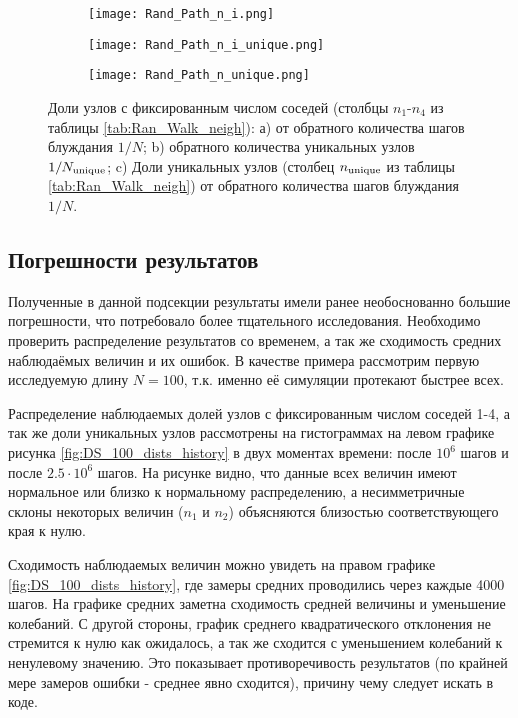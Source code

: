 \begin{figure}[h]

\begin{subfigure}{0.5\textwidth}
\texttt{[image: Rand\_Path\_n\_i.png]}
\caption{}
\label{fig:DS_n_i}
\end{subfigure}
\hfill
\begin{subfigure}{0.5\textwidth}
\texttt{[image: Rand\_Path\_n\_i\_unique.png]}
\caption{}
\label{fig:DS_n_iu}
\end{subfigure}
\vfill
\centering
\begin{subfigure}{0.5\textwidth}
\texttt{[image: Rand\_Path\_n\_unique.png]}
\caption{}
\label{fig:DS_n_u}
\end{subfigure}
\caption{Доли узлов с фиксированным числом соседей (столбцы $n_1$-$n_4$ из таблицы \ref{tab:Ran_Walk_neigh}): а) от обратного количества шагов блуждания $1/N$; b) обратного количества уникальных узлов $1/N_{\textup{unique}}$; c) Доли уникальных узлов (столбец $n_{\textup{unique}}$ из таблицы \ref{tab:Ran_Walk_neigh}) от обратного количества шагов блуждания $1/N$. }
\end{figure} 

\newpage

\subsection{Погрешности результатов}

Полученные в данной подсекции результаты имели ранее необоснованно большие погрешности, что потребовало более тщательного исследования. 
Необходимо проверить распределение результатов со временем, а так же сходимость средних наблюдаёмых величин и их ошибок.
 В качестве примера рассмотрим первую исследуемую длину $N=100$, т.к. именно её симуляции протекают быстрее всех.  

Распределение наблюдаемых долей узлов с фиксированным числом соседей 1-4, а так же доли уникальных узлов рассмотрены на гистограммах на левом графике рисунка \ref{fig:DS_100_dists_history}  в двух моментах времени: после $10^6$ шагов и после $2.5 \cdot 10^6$  шагов. 
На рисунке видно, что данные всех величин имеют нормальное или близко к нормальному распределению, а несимметричные склоны  некоторых величин ($n_1$ и $n_2$) объясняются близостью соответствующего края к нулю.

Сходимость наблюдаемых величин можно увидеть на правом графике \ref{fig:DS_100_dists_history}, где замеры средних проводились через каждые 4000 шагов. На графике средних заметна сходимость средней величины и уменьшение колебаний. 
С другой стороны, график среднего квадратического отклонения не стремится к нулю как ожидалось, а так же сходится с уменьшением колебаний к ненулевому значению. 
Это показывает противоречивость результатов (по крайней мере замеров ошибки - среднее явно сходится), причину чему следует искать в коде. 

